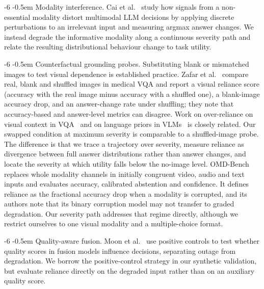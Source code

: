 \documentclass[graybox]{svmult}
\makeatletter
\renewcommand\paragraph{\@startsection{paragraph}{4}{\z@}%
  {-6\p@ \@plus -2\p@ \@minus -2\p@}%
  {-0.5em}%
  {\normalfont\normalsize\bfseries}}
\makeatother
\begin{document}
\paragraph{Modality interference.}
Cai et al.~\cite{cai2025interference} study how signals from a
non-essential modality distort multimodal LLM decisions by applying discrete
perturbations to an irrelevant input and measuring argmax answer changes.
We instead degrade the informative modality along a continuous severity path
and relate the resulting distributional behaviour change to task utility.

\paragraph{Counterfactual grounding probes.}
Substituting blank or mismatched images to test visual dependence is
established practice. Zafar et al.~\cite{zafar2026grounding} compare real,
blank and shuffled images in medical VQA and report a visual reliance
score (accuracy with the real image minus accuracy with a shuffled one),
a blank-image accuracy drop, and an answer-change rate under shuffling;
they note that accuracy-based and answer-level metrics can disagree. Work
on over-reliance on visual context in VQA~\cite{gupta2022swapmix}
and on language priors in VLMs~\cite{goyal2017making,agrawal2018dont} is
closely related. Our swapped
condition at maximum severity is comparable to a shuffled-image probe. The
difference is that we trace a trajectory over severity, measure reliance
as divergence between full answer distributions rather than answer
changes, and locate the severity at which utility falls below the
no-image level.
OMD-Bench~\cite{nazi2026omd} replaces whole modality channels in
initially congruent video, audio and text inputs and evaluates
accuracy, calibrated abstention and confidence. It defines reliance as the
fractional accuracy drop when a modality is corrupted, and its authors
note that its binary corruption model may not transfer to graded
degradation. Our severity path addresses that regime directly, although
we restrict ourselves to one visual modality and a multiple-choice
format.

\paragraph{Quality-aware fusion.}
Moon et al.~\cite{moon2026quality} use positive controls to test whether
quality scores in fusion models influence decisions, separating outage from
degradation. We borrow the positive-control strategy in our synthetic
validation, but evaluate reliance directly on the degraded input rather than on
an auxiliary quality score.
\end{document}
